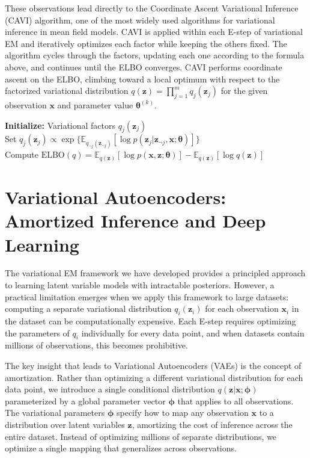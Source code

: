 These observations lead directly to the Coordinate Ascent Variational Inference (CAVI) algorithm, one of the most widely used algorithms for variational inference in mean field models. CAVI is applied within each E-step of variational EM and iteratively optimizes each factor while keeping the others fixed. The algorithm cycles through the factors, updating each one according to the formula above, and continues until the ELBO converges. CAVI performs coordinate ascent on the ELBO, climbing toward a local optimum with respect to the factorized variational distribution $q(\mathbf{z}) = \prod_{j=1}^m q_j(\mathbf{z}_j)$ for the given observation $\mathbf{x}$ and parameter value $\boldsymbol{\theta}^{(k)}$.

\begin{algorithm}[t]
\textbf{Initialize:} Variational factors $q_j(\mathbf{z}_j)$ \\
 {
   {
    Set $q_j(\mathbf{z}_j) \propto \exp \{\mathbb{E}_{q_{\neg j}(\mathbf{z}_{\neg j})}[\log p(\mathbf{z}_{j} | \mathbf{z}_{\neg j}, \mathbf{x};\boldsymbol{\theta})]\}$\\
  }
  Compute $\text{ELBO}(q) = \mathbb{E}_{q(\mathbf{z})}[\log p(\mathbf{x}, \mathbf{z};\boldsymbol{\theta})] - \mathbb{E}_{q(\mathbf{z})}[\log q(\mathbf{z})]$
}
\caption{CAVI}%
\label{alg:cavi}
\end{algorithm}

\section*{Variational Autoencoders: Amortized Inference and Deep Learning}

The variational EM framework we have developed provides a principled approach to learning latent variable models with intractable posteriors. However, a practical limitation emerges when we apply this framework to large datasets: computing a separate variational distribution $q_i(\mathbf{z}_i)$ for each observation $\mathbf{x}_i$ in the dataset can be computationally expensive. Each E-step requires optimizing the parameters of $q_i$ individually for every data point, and when datasets contain millions of observations, this becomes prohibitive.

The key insight that leads to Variational Autoencoders (VAEs) is the concept of amortization. Rather than optimizing a different variational distribution for each data point, we introduce a single conditional distribution $q(\mathbf{z}|\mathbf{x}; \boldsymbol{\phi})$ parameterized by a global parameter vector $\boldsymbol{\phi}$ that applies to all observations. The variational parameters $\boldsymbol{\phi}$ specify how to map any observation $\mathbf{x}$ to a distribution over latent variables $\mathbf{z}$, amortizing the cost of inference across the entire dataset. Instead of optimizing millions of separate distributions, we optimize a single mapping that generalizes across observations.

